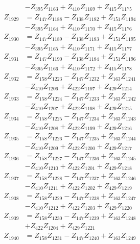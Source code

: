 \begin{multicols}{2}
\begin{align}
&- Z_{395}Z_{1163} + Z_{410}Z_{1169} + Z_{415}Z_{1175} \nonumber \\
Z_{1929} &= Z_{147}Z_{1188} - Z_{138}Z_{1182} + Z_{151}Z_{1194}  \nonumber \\
&- Z_{395}Z_{1164} + Z_{410}Z_{1170} + Z_{415}Z_{1176} \nonumber \\
Z_{1930} &= Z_{147}Z_{1189} - Z_{138}Z_{1183} + Z_{151}Z_{1195}  \nonumber \\
&- Z_{395}Z_{1165} + Z_{410}Z_{1171} + Z_{415}Z_{1177} \nonumber \\
Z_{1931} &= Z_{147}Z_{1190} - Z_{138}Z_{1184} + Z_{151}Z_{1196}  \nonumber \\
&- Z_{395}Z_{1166} + Z_{410}Z_{1172} + Z_{415}Z_{1178} \nonumber \\
Z_{1932} &= Z_{158}Z_{1223} - Z_{147}Z_{1232} + Z_{163}Z_{1241}  \nonumber \\
&- Z_{410}Z_{1206} + Z_{422}Z_{1197} + Z_{429}Z_{1214} \nonumber \\
Z_{1933} &= Z_{158}Z_{1224} - Z_{147}Z_{1233} + Z_{163}Z_{1242}  \nonumber \\
&- Z_{410}Z_{1207} + Z_{422}Z_{1198} + Z_{429}Z_{1215} \nonumber \\
Z_{1934} &= Z_{158}Z_{1225} - Z_{147}Z_{1234} + Z_{163}Z_{1243}  \nonumber \\
&- Z_{410}Z_{1208} + Z_{422}Z_{1199} + Z_{429}Z_{1216} \nonumber \\
Z_{1935} &= Z_{158}Z_{1226} - Z_{147}Z_{1235} + Z_{163}Z_{1244}  \nonumber \\
&- Z_{410}Z_{1209} + Z_{422}Z_{1200} + Z_{429}Z_{1217} \nonumber \\
Z_{1936} &= Z_{158}Z_{1227} - Z_{147}Z_{1236} + Z_{163}Z_{1245}  \nonumber \\
&- Z_{410}Z_{1210} + Z_{422}Z_{1201} + Z_{429}Z_{1218} \nonumber \\
Z_{1937} &= Z_{158}Z_{1228} - Z_{147}Z_{1237} + Z_{163}Z_{1246}  \nonumber \\
&- Z_{410}Z_{1211} + Z_{422}Z_{1202} + Z_{429}Z_{1219} \nonumber \\
Z_{1938} &= Z_{158}Z_{1229} - Z_{147}Z_{1238} + Z_{163}Z_{1247}  \nonumber \\
&- Z_{410}Z_{1212} + Z_{422}Z_{1203} + Z_{429}Z_{1220} \nonumber \\
Z_{1939} &= Z_{158}Z_{1230} - Z_{147}Z_{1239} + Z_{163}Z_{1248}  \nonumber \\
&+ Z_{422}Z_{1204} + Z_{429}Z_{1221} \nonumber \\
Z_{1940} &= Z_{158}Z_{1231} - Z_{147}Z_{1240} + Z_{163}Z_{1249}  \nonumber \\

\end{align}
\end{multicols}
